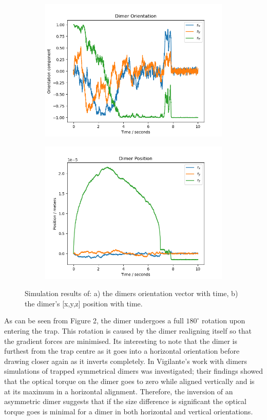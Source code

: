 \documentclass[11pt]{article}
\begin{document}
\begin{figure}[h]
	\centering
	\begin{subfigure}{0.45\textwidth}
		\includegraphics[width =\textwidth]{traj.png}
	\end{subfigure}
	\begin{subfigure}{0.45\textwidth}
		\includegraphics[width=\textwidth]{pos.png}
	\end{subfigure}
	\caption{Simulation results of: a) the dimers orientation vector with time, b) the dimer's [x,y,z] position with time.}
\end{figure}

As can be seen from Figure 2, the dimer undergoes a full $180^{\circ}$ rotation upon entering the trap. This rotation is caused by the dimer realigning itself so that the gradient forces are minimised. Its interesting to note that the dimer is furthest from the trap centre as it goes into a horizontal orientation before drawing closer again as it inverts completely. In Vigilante's work with dimers \cite{5} simulations of trapped symmetrical dimers was investigated; their findings showed that the optical torque on the dimer goes to zero while aligned vertically and is at its maximum in a horizontal alignment. Therefore, the inversion of an asymmetric dimer suggests that if the size difference is significant the optical torque goes is minimal for a dimer in both horizontal and vertical orientations. 
\end{document}
